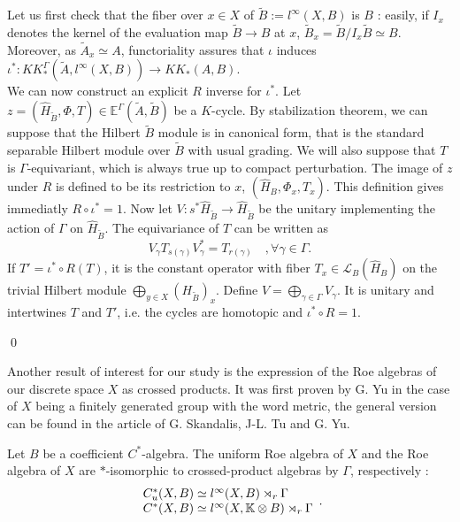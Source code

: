 \begin{dem}
Let us first check that the fiber over $x\in X$ of $\tilde B :=l^\infty(X,B)$ is $B$ : easily, if $I_x$ denotes the kernel of the evaluation map $\tilde B \rightarrow B$ at $x$, $\tilde B_x = \tilde B / I_x \tilde B\simeq B $. Moreover, as $\tilde A_x \simeq A$, functoriality assures that $\iota$ induces $\iota^* : KK_*^\Gamma(\tilde A, l^\infty(X, B))\rightarrow KK_*(A, B)$.\\

We can now construct an explicit $R$ inverse for $\iota^*$. Let $z=(\hat H_{\tilde B},\Phi, T)\in \mathbb E^\Gamma(\tilde A,\tilde B)$ be a $K$-cycle. By stabilization theorem, we can suppose that the Hilbert $\tilde B$ module is in canonical form, that is the standard separable Hilbert module over $\tilde B$ with usual grading. We will also suppose that $T$ is $\Gamma$-equivariant, which is always true up to compact perturbation. The image of $z$ under $R$ is defined to be its restriction to $x$, $(\hat H_B,\Phi_x,T_x)$. This definition gives immediatly $R\circ \iota^* = 1$. Now let $V : s^* \hat H_{\tilde B}\rightarrow \hat H_{\tilde B}$ be the unitary implementing the action of $\Gamma$ on $\hat H_{\tilde B}$. The equivariance of $T$ can be written as 
\[V_\gamma T_{s(\gamma)} V_\gamma^* = T_{r(\gamma)}\quad,\forall \gamma \in \Gamma. \]
If $T' = \iota^*\circ R(T)$, it is the constant operator with fiber $T_x\in \mathcal L_B(\hat H_B)$ on the trivial Hilbert module $\bigoplus_{y\in X}(H_{\tilde B})_x $. Define $V=\bigoplus_{\gamma \in \Gamma} V_\gamma$. It is unitary and intertwines $T$ and $T'$, i.e. the cycles are homotopic and $\iota^*\circ R = 1$.

\qed
\end{dem}

Another result of interest for our study is the expression of the Roe algebras of our discrete space $X$ as crossed products. It was first proven by G. Yu in the case of $X$ being a finitely generated group with the word metric, the general version can be found in the article of G. Skandalis, J-L. Tu and G. Yu. \cite{SkTuYu}

\begin{lem}
Let $B$ be a coefficient $C^*$-algebra. The uniform Roe algebra of $X$  and the Roe algebra of $X$ are $*$-isomorphic to crossed-product algebras by $\Gamma$, respectively : 
\[\begin{array}{ll} C_u^* (X,B) \simeq l^\infty(X,B) \rtimes_r \Gamma \\ C^* (X,B) \simeq l^\infty(X,\mathbb K\otimes B) \rtimes_r \Gamma \end{array}.\]
\end{lem}

